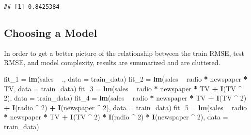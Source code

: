 \documentclass[]{report}
\newenvironment{Shaded}{\begin{snugshade}}{\end{snugshade}}
\newcommand{\KeywordTok}[1]{\textcolor[rgb]{0.13,0.29,0.53}{\textbf{#1}}}
\newcommand{\DataTypeTok}[1]{\textcolor[rgb]{0.13,0.29,0.53}{#1}}
\newcommand{\DecValTok}[1]{\textcolor[rgb]{0.00,0.00,0.81}{#1}}
\newcommand{\StringTok}[1]{\textcolor[rgb]{0.31,0.60,0.02}{#1}}
\newcommand{\OperatorTok}[1]{\textcolor[rgb]{0.81,0.36,0.00}{\textbf{#1}}}
\newcommand{\NormalTok}[1]{#1}
\begin{document}
\begin{verbatim}
## [1] 0.8425384
\end{verbatim}

\subsection{Choosing a Model}\label{choosing-a-model}

In order to get a better picture of the relationship between the train
RMSE, test RMSE, and model complexity, results are summarized and are
cluttered.

\begin{Shaded}
\begin{Highlighting}[]
\NormalTok{fit_}\DecValTok{1}\NormalTok{ =}\StringTok{ }\KeywordTok{lm}\NormalTok{(sales }\OperatorTok{~}\StringTok{ }\NormalTok{., }\DataTypeTok{data =}\NormalTok{ train_data)}
\NormalTok{fit_}\DecValTok{2}\NormalTok{ =}\StringTok{ }\KeywordTok{lm}\NormalTok{(sales }\OperatorTok{~}\StringTok{ }\NormalTok{radio }\OperatorTok{*}\StringTok{ }\NormalTok{newspaper }\OperatorTok{*}\StringTok{ }\NormalTok{TV, }\DataTypeTok{data =}\NormalTok{ train_data)}
\NormalTok{fit_}\DecValTok{3}\NormalTok{ =}\StringTok{ }\KeywordTok{lm}\NormalTok{(sales }\OperatorTok{~}\StringTok{ }\NormalTok{radio }\OperatorTok{*}\StringTok{ }\NormalTok{newspaper }\OperatorTok{*}\StringTok{ }\NormalTok{TV }\OperatorTok{+}\StringTok{ }\KeywordTok{I}\NormalTok{(TV }\OperatorTok{^}\StringTok{ }\DecValTok{2}\NormalTok{), }\DataTypeTok{data =}\NormalTok{ train_data)}
\NormalTok{fit_}\DecValTok{4}\NormalTok{ =}\StringTok{ }\KeywordTok{lm}\NormalTok{(sales }\OperatorTok{~}\StringTok{ }\NormalTok{radio }\OperatorTok{*}\StringTok{ }\NormalTok{newspaper }\OperatorTok{*}\StringTok{ }\NormalTok{TV }\OperatorTok{+}\StringTok{ }
\StringTok{           }\KeywordTok{I}\NormalTok{(TV }\OperatorTok{^}\StringTok{ }\DecValTok{2}\NormalTok{) }\OperatorTok{+}\StringTok{ }\KeywordTok{I}\NormalTok{(radio }\OperatorTok{^}\StringTok{ }\DecValTok{2}\NormalTok{) }\OperatorTok{+}\StringTok{ }\KeywordTok{I}\NormalTok{(newspaper }\OperatorTok{^}\StringTok{ }\DecValTok{2}\NormalTok{), }\DataTypeTok{data =}\NormalTok{ train_data)}
\NormalTok{fit_}\DecValTok{5}\NormalTok{ =}\StringTok{ }\KeywordTok{lm}\NormalTok{(sales }\OperatorTok{~}\StringTok{ }\NormalTok{radio }\OperatorTok{*}\StringTok{ }\NormalTok{newspaper }\OperatorTok{*}\StringTok{ }\NormalTok{TV }\OperatorTok{+}
\StringTok{           }\KeywordTok{I}\NormalTok{(TV }\OperatorTok{^}\StringTok{ }\DecValTok{2}\NormalTok{) }\OperatorTok{*}\StringTok{ }\KeywordTok{I}\NormalTok{(radio }\OperatorTok{^}\StringTok{ }\DecValTok{2}\NormalTok{) }\OperatorTok{*}\StringTok{ }\KeywordTok{I}\NormalTok{(newspaper }\OperatorTok{^}\StringTok{ }\DecValTok{2}\NormalTok{), }\DataTypeTok{data =}\NormalTok{ train_data)}
\end{Highlighting}
\end{Shaded}
\end{document}
